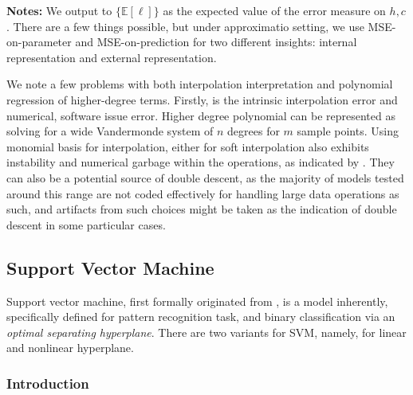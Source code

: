 \documentclass[10pt]{article} %
\begin{document}
\begin{table}[htb]
\begin{threeparttable}
    \begin{tablenotes}
      \footnotesize
      \item[] \textbf{Notes:} We output to $\{\mathbb{E}[\ell]\}$ as the expected value of the error measure on $h,c$. There are a few things possible, but under approximatio setting, we use MSE-on-parameter and MSE-on-prediction for two different insights: internal representation and external representation. 
    \end{tablenotes}
  \end{threeparttable}
\end{table}

We note a few problems with both interpolation interpretation and polynomial regression of higher-degree terms. Firstly, is the intrinsic interpolation error and numerical, software issue error. Higher degree polynomial can be represented as solving for a wide Vandermonde system of $n$ degrees for $m$ sample points. Using monomial basis for interpolation, either for soft interpolation also exhibits instability and numerical garbage within the operations, as indicated by \cite{Shen_2025}. They can also be a potential source of double descent, as the majority of models tested around this range are not coded effectively for handling large data operations as such, and artifacts from such choices might be taken as the indication of double descent in some particular cases. 

\clearpage

\subsection{Support Vector Machine}

Support vector machine, first formally originated from \cite{Vapnik1999-VAPTNO}, is a model inherently, specifically defined for pattern recognition task, and binary classification via an \textit{optimal separating hyperplane}. There are two variants for SVM, namely, for linear and nonlinear hyperplane. 

\subsubsection{Introduction}
\end{document}
